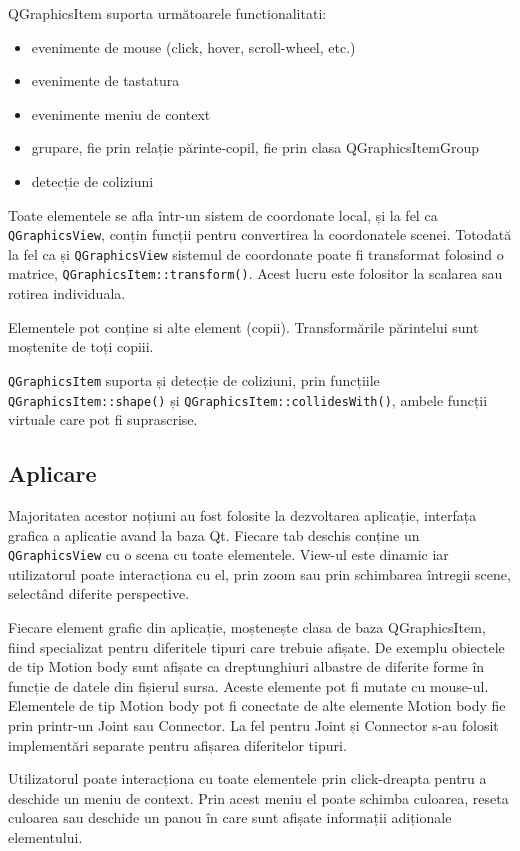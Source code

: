 \begin{itemize}
    QGraphicsItem suporta următoarele functionalitati:
    \begin{itemize}
        \item evenimente de mouse (click, hover, scroll-wheel, etc.)
        \item evenimente de tastatura
        \item evenimente meniu de context
        \item grupare, fie prin relație părinte-copil, fie prin clasa QGraphicsItemGroup
        \item detecție de coliziuni
    \end{itemize}

    Toate elementele se afla într-un sistem de coordonate local, și la fel ca \verb|QGraphicsView|, conțin funcții pentru 
    convertirea la coordonatele scenei. Totodată la fel ca și \verb|QGraphicsView| sistemul de coordonate poate fi transformat 
    folosind o matrice, \verb|QGraphicsItem::transform()|. Acest lucru este folositor la scalarea sau rotirea individuala.\newline

    Elementele pot conține si alte element (copii). Transformările părintelui sunt moștenite de toți copiii.\newline
    
    \verb|QGraphicsItem| suporta și detecție de coliziuni, prin funcțiile \verb|QGraphicsItem::shape()| și \verb|QGraphicsItem::collidesWith()|, 
    ambele funcții virtuale care pot fi suprascrise.\newline
\end{itemize}

\subsection{Aplicare}

Majoritatea acestor noțiuni au fost folosite la dezvoltarea aplicație, interfața grafica a aplicatie avand la baza Qt. 
Fiecare tab deschis conține un \verb|QGraphicsView| cu o scena cu toate elementele. 
View-ul este dinamic iar utilizatorul poate interacționa cu el, prin zoom sau prin schimbarea întregii scene, 
selectând diferite perspective.\newline 

Fiecare element grafic din aplicație, moștenește clasa de baza QGraphicsItem, 
fiind specializat pentru diferitele tipuri care trebuie afișate. De exemplu obiectele de tip Motion body sunt 
afișate ca dreptunghiuri albastre de diferite forme în funcție de datele din fișierul sursa. Aceste elemente 
pot fi mutate cu mouse-ul. Elementele de tip Motion body pot fi conectate de alte elemente Motion body fie prin 
printr-un Joint sau Connector. La fel pentru Joint și Connector s-au folosit implementări separate pentru afișarea 
diferitelor tipuri.\newline 

Utilizatorul poate interacționa cu toate elementele prin click-dreapta pentru a deschide un meniu de context. 
Prin acest meniu el poate schimba culoarea, reseta culoarea sau deschide un panou în care sunt afișate informații adiționale 
elementului.\newline






